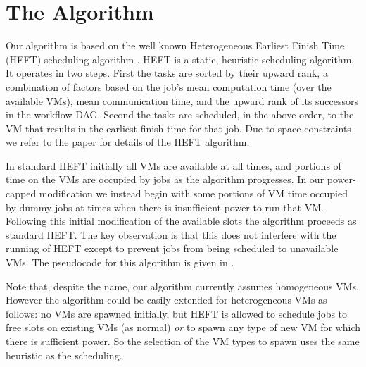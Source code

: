 \documentclass[10pt, conference, compsocconf]{IEEEtran} %
\begin{document}
\section{The Algorithm}

Our algorithm is based on the well known Heterogeneous Earliest Finish Time (HEFT) scheduling algorithm \cite{Topcuoglu2002heft}.
HEFT is a static, heuristic scheduling algorithm.
It operates in two steps.
First the tasks are sorted by their upward rank, a combination of factors based on the job's mean computation time (over the available VMs), mean communication time, and the upward rank of its successors in the workflow DAG.
Second the tasks are scheduled, in the above order, to the VM that results in the earliest finish time for that job.
Due to space constraints we refer to the paper \cite{Topcuoglu2002heft} for details of the HEFT algorithm.

In standard HEFT initially all VMs are available at all times, and portions of time on the VMs are occupied by jobs as the algorithm progresses.
In our power-capped modification we instead begin with some portions of VM time occupied by dummy jobs at times when there is insufficient power to run that VM.
Following this initial modification of the available slots the algorithm proceeds as standard HEFT.
The key observation is that this does not interfere with the running of HEFT except to prevent jobs from being scheduled to unavailable VMs.
The pseudocode for this algorithm is given in .

Note that, despite the name, our algorithm currently assumes homogeneous VMs.
However the algorithm could be easily extended for heterogeneous VMs as follows: no VMs are spawned initially, but HEFT is allowed to schedule jobs to free slots on existing VMs (as normal) \emph{or} to spawn any type of new VM for which there is sufficient power.
So the selection of the VM types to spawn uses the same heuristic as the scheduling.


\end{document}
